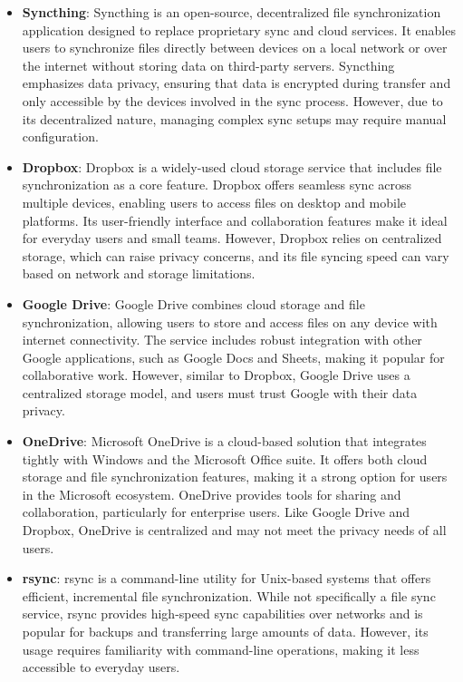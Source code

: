 \documentclass{article}
\begin{document}
    \begin{itemize}
      \item \textbf{Syncthing}: Syncthing is an open-source, decentralized file synchronization application designed to replace proprietary sync and cloud services. It enables users to synchronize files directly between devices on a local network or over the internet without storing data on third-party servers. Syncthing emphasizes data privacy, ensuring that data is encrypted during transfer and only accessible by the devices involved in the sync process. However, due to its decentralized nature, managing complex sync setups may require manual configuration.

      \item \textbf{Dropbox}: Dropbox is a widely-used cloud storage service that includes file synchronization as a core feature. Dropbox offers seamless sync across multiple devices, enabling users to access files on desktop and mobile platforms. Its user-friendly interface and collaboration features make it ideal for everyday users and small teams. However, Dropbox relies on centralized storage, which can raise privacy concerns, and its file syncing speed can vary based on network and storage limitations.

      \item \textbf{Google Drive}: Google Drive combines cloud storage and file synchronization, allowing users to store and access files on any device with internet connectivity. The service includes robust integration with other Google applications, such as Google Docs and Sheets, making it popular for collaborative work. However, similar to Dropbox, Google Drive uses a centralized storage model, and users must trust Google with their data privacy.

      \item \textbf{OneDrive}: Microsoft OneDrive is a cloud-based solution that integrates tightly with Windows and the Microsoft Office suite. It offers both cloud storage and file synchronization features, making it a strong option for users in the Microsoft ecosystem. OneDrive provides tools for sharing and collaboration, particularly for enterprise users. Like Google Drive and Dropbox, OneDrive is centralized and may not meet the privacy needs of all users.

      \item \textbf{rsync}: rsync is a command-line utility for Unix-based systems that offers efficient, incremental file synchronization. While not specifically a file sync service, rsync provides high-speed sync capabilities over networks and is popular for backups and transferring large amounts of data. However, its usage requires familiarity with command-line operations, making it less accessible to everyday users. 


\end{itemize}
\end{document}
